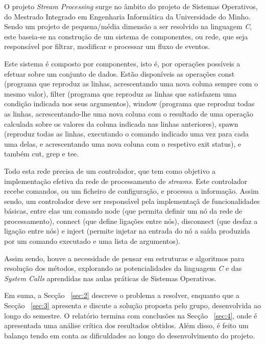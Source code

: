 \documentclass[a4paper]{article}
\begin{document}
\hspace{3mm} O projeto \emph{Stream Processing} surge no âmbito do projeto de Sistemas Operativos, do Mestrado Integrado em Engenharia Informática da Universidade do Minho. Sendo um projeto de pequena/média dimensão a ser resolvido na linguagem \emph{C}, este baseia-se na construção de um sistema de componentes, ou rede, que seja responsável por filtrar, modificar e processar um fluxo de eventos.
\par Este sistema é composto por componentes, isto é, por operações possíveis a efetuar sobre um conjunto de dados. Estão disponíveis as operações const (programa que reproduz as linhas, acrescentando uma nova coluna sempre com o mesmo valor), filter (programa que reproduz as linhas que satisfazem uma condição indicada nos seus argumentos), window (programa que reproduz todas as linhas, acrescentando-lhe uma nova coluna com o resultado de uma operação calculada sobre os valores da coluna indicada nas linhas anteriores), spawn (reproduz todas as linhas, executando o comando indicado uma vez para cada uma delas, e acrescentando uma nova coluna com o respetivo exit status), e também cut, grep e tee.
\par Todo esta rede precisa de um controlador, que tem como objetivo a implementação efetiva da rede de processamento de \emph{streams}. Este controlador recebe comandos, ou um ficheiro de configuração, e processa a informação. Assim sendo, um controlador deve ser responsável pela implementaçã de funcionalidades básicas, entre elas um comando node (que permita definir um nó da rede de processamento), connect (que define ligações entre nós), disconnect (que desfaz a ligação entre nós) e inject (permite injetar na entrada do nó a saída produzida por um comando executado e uma lista de argumentos).
\par Assim sendo, houve a necessidade de pensar em estruturas e algoritmos para resolução dos métodos, explorando as potencialidades da linguagem \emph{C} e das \emph{System Calls} aprendidas nas aulas práticas de Sistemas Operativos. 
\par Em suma, a Secção ~\ref{sec:2} descreve o problema a resolver, enquanto que a Secção ~\ref{sec:3} apresenta e discute a solução proposta pelo grupo, desenvolvida ao longo do semestre. O relatório termina com conclusões na  Secção ~\ref{sec:4}, onde é apresentada uma análise crítica dos resultados obtidos. Além disso, é feito um balanço tendo em conta as dificuldades ao longo do desenvolvimento do projeto.
\end{document}
